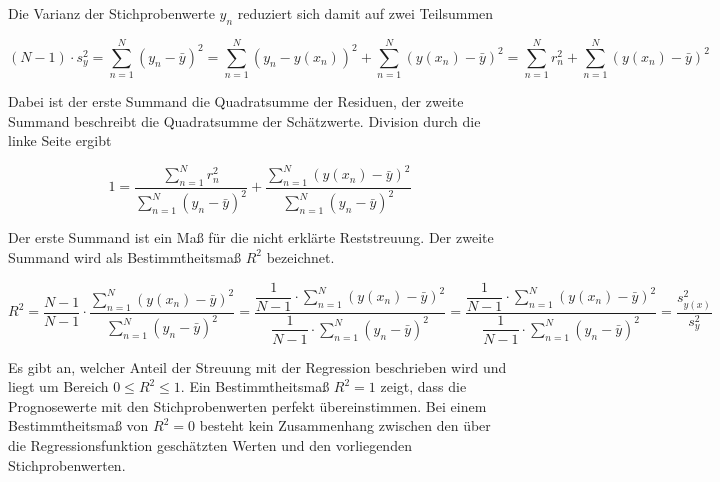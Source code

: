\noindent Die Varianz der Stichprobenwerte $y_{n}$ reduziert sich damit auf zwei Teilsummen

\begin{equation}\label{eq:twelveonehundredseventeen}
(N-1)\cdot s_{y}^{2} =\displaystyle\sum\limits _{n=1}^{N}\left(y_{n} -\bar{y}\right)^{2}  =\displaystyle\sum\limits _{n=1}^{N}\left(y_{n} -y(x_{n})\right)^{2}  +\displaystyle\sum\limits _{n=1}^{N}\left(y(x_{n})-\bar{y}\right)^{2}  =\displaystyle\sum\limits _{n=1}^{N}r_{n}^{2}  +\displaystyle\sum\limits _{n=1}^{N}\left(y(x_{n})-\bar{y}\right)^{2}
\end{equation}

\noindent Dabei ist der erste Summand die Quadratsumme der Residuen, der zweite Summand beschreibt die Quadratsumme der Sch\"{a}tzwerte. Division durch die linke Seite ergibt

\begin{equation}\label{eq:twelveonehundredeighteen}
1=\dfrac{\displaystyle\sum\limits _{n=1}^{N}r_{n}^{2}}{\displaystyle\sum\limits _{n=1}^{N}(y_{n} -\bar{y})^{2}} +\dfrac{\displaystyle\sum\limits_{n=1}^{N}\left(y(x_{n})-\bar{y}\right)^{2}}{\displaystyle\sum\limits _{n=1}^{N}(y_{n} -\bar{y})^{2}}
\end{equation}

\noindent Der erste Summand ist ein Ma{\ss} f\"{u}r die nicht erkl\"{a}rte Reststreuung. Der zweite Summand wird als Bestimmtheitsma{\ss} $R^{2}$ bezeichnet. 

\begin{equation}\label{eq:twelveonehundrednineteen}
R^{2} =\dfrac{N-1}{N-1} \cdot \dfrac{\displaystyle\sum\limits _{n=1}^{N}\left(y(x_{n})-\bar{y}\right)^{2}}{\displaystyle\sum\limits _{n=1}^{N}\left(y_{n} -\bar{y}\right)^{2}} =\dfrac{\dfrac{1}{N-1} \cdot \displaystyle\sum\limits _{n=1}^{N}\left(y(x_{n})-\bar{y}\right)^{2}  }{\dfrac{1}{N-1} \cdot \displaystyle\sum\limits_{n=1}^{N}\left(y_{n} -\bar{y}\right)^{2}} =\dfrac{\dfrac{1}{N-1} \cdot \displaystyle\sum\limits _{n=1}^{N}\left(y(x_{n})-\bar{y}\right)^{2}  }{\dfrac{1}{N-1} \cdot \displaystyle\sum\limits _{n=1}^{N}\left(y_{n} -\bar{y}\right)^{2}} =\dfrac{s_{y(x)}^{2}}{s_{y}^{2}}
\end{equation}

\noindent Es gibt an, welcher Anteil der Streuung mit der Regression beschrieben wird und liegt um Bereich $0 \le R^{2} \le 1$. Ein Bestimmtheitsma{\ss} $R^{2} = 1$ zeigt, dass die Prognosewerte mit den Stichprobenwerten perfekt \"{u}bereinstimmen. Bei einem Bestimmtheitsma{\ss} von $R^{2} = 0$ besteht kein Zusammenhang zwischen den \"{u}ber die Regressionsfunktion gesch\"{a}tzten Werten und den vorliegenden Stichprobenwerten.\newline

